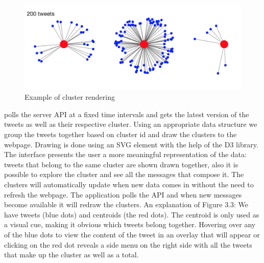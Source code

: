 \begin{figure}[ht!]
\centering
\includegraphics[width=\textwidth,height=\textheight,keepaspectratio]{src/img/clusters.png}
\caption{Example of cluster rendering\label{overflow}}
\end{figure}

{\frontend}  polls the server API at a fixed time intervals and gets the latest version of the tweets as well as their respective cluster. Using an appropriate data structure we group the tweets together based on cluster id and draw the clusters to the webpage. Drawing is done using an SVG element with the help of the D3 library.
\newline
The interface presents the user a more meaningful representation of the data: tweets that belong to the same cluster are shown drawn together, also it is possible to explore the cluster and see all the messages that compose it.
\newline
The clusters will automatically update when new data comes in without the need to refresh the webpage. The application polls the API and when new messages become available it will redraw the clusters.
\newline
An explanation of Figure 3.3: We have tweets (blue dots) and centroids (the red dots). The centroid is only used as a visual cue, making it obvious which tweets belong together. Hovering over any of the blue dots to view the content of the tweet in an overlay that will appear or clicking on the red dot reveals a side menu on the right side with all the tweets that make up the cluster as well as a total.
